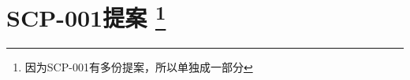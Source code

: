 \part[SCP-001提案]{
	SCP-001提案
	\protect\footnote{因为SCP-001有多份提案，所以单独成一部分}
}

\setcounter{chapter}{-1}




































